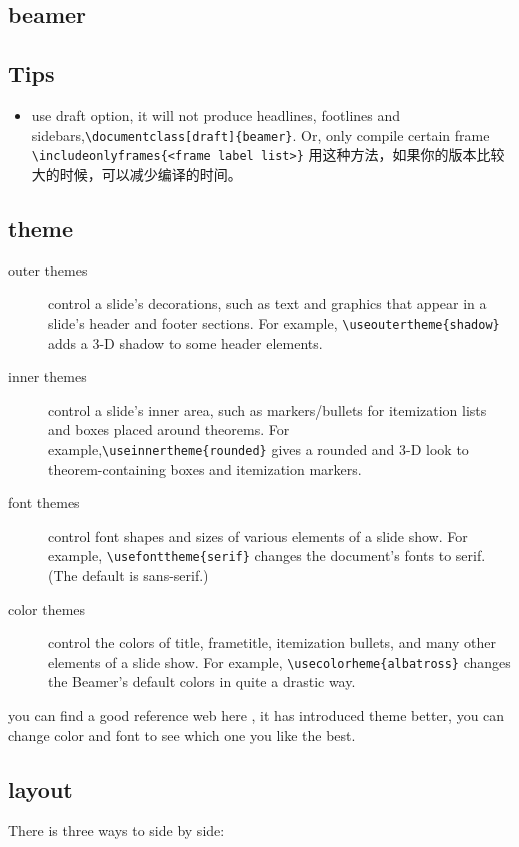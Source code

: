 \documentclass[a4paper,12pt,twoside]{book}
\begin{document}
\begin{CJK*}{UTF8}{song}
\section{beamer}
	\subsection{Tips}
	\begin{itemize}
		\item use draft option, it will not produce headlines, footlines and sidebars,\linebreak[4] \verb=\documentclass[draft]{beamer}=. Or, only compile certain frame \linebreak[4] \verb=\includeonlyframes{<frame label list>}= 用这种方法，如果你的版本比较大的时候，可以减少编译的时间。
	\end{itemize}

	\subsection{theme}
	\begin{description}
		\item[outer themes] control a slide's decorations, such as text and graphics that appear in a slide's header and footer sections. For example, \linebreak[4] \verb=\useoutertheme{shadow}= adds a 3-D shadow to some header elements.
		\item[inner themes] control a slide's inner area, such as markers/bullets for itemization lists and boxes placed around theorems. For example,\linebreak[4] \verb=\useinnertheme{rounded}= gives a rounded and 3-D look to theorem-containing boxes and itemization markers.
		\item[font themes] control font shapes and sizes of various elements of a slide show. For example, \verb=\usefonttheme{serif}= changes the document's fonts to serif. (The default is sans-serif.)
		\item[color themes] control the colors of title, frametitle, itemization bullets, and many other elements of a slide show. For example, \linebreak[4] \verb=\usecolorheme{albatross}= changes the Beamer's default colors in quite a drastic way.
	\end{description}
	you can find a good reference web here \cite{QuickStart}, it has introduced theme better, you can change color and font to see which one you like the best.
	\subsection{layout}
	There is three ways to side by side:
	\begin{itemize}
	

\end{itemize}
\end{CJK*}
\end{document}
